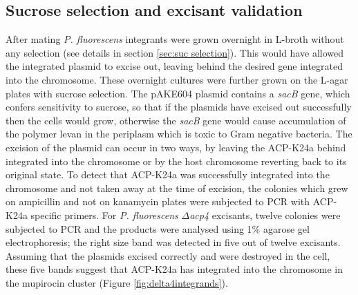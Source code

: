 	\subsection{Sucrose selection and excisant validation}
	\label{sec:chap4suc selection}
	After mating  \textit{P. fluorescens} integrants were grown overnight in L-broth without any selection (see details in section \ref{sec:suc selection}). This would have allowed the integrated plasmid to excise out, leaving behind the desired gene integrated into the chromosome. These overnight cultures were further grown on the L-agar plates with sucrose selection. The pAKE604 plasmid contains a \textit{sacB} gene, which confers sensitivity to sucrose, so that if the plasmids have excised out successfully then the cells would grow, otherwise the \textit{sacB} gene would cause accumulation of the polymer levan in the periplasm which is toxic to Gram negative bacteria. 
	The excision of the plasmid can occur in two ways, by leaving the ACP-K24a behind integrated into the chromosome or by the host chromosome reverting back to its original state. To detect that ACP-K24a was successfully integrated into the chromosome and not taken away at the time of excision, the colonies which grew on ampicillin and not on kanamycin plates were subjected to PCR with ACP-K24a specific primers. For \textit{P. fluorescens} $ \Delta $\textit{acp4} excisants, twelve colonies were subjected to PCR and the products were analysed using 1\% agarose gel electrophoresis; the right size band was detected in five out of twelve excisants. Assuming that the plasmids excised correctly and were destroyed in the cell, these five bands suggest that ACP-K24a has integrated into the chromosome in the mupirocin cluster (Figure \ref{fig:delta4integrands}). 
	
